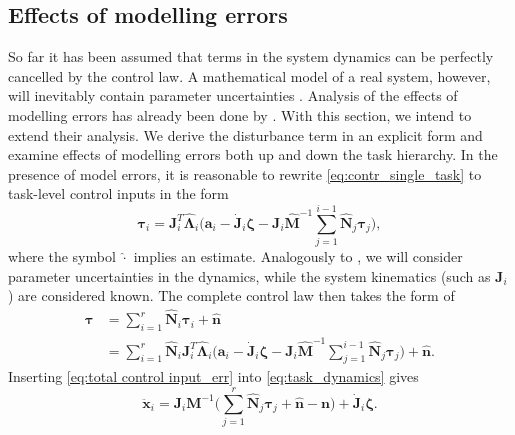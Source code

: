 \documentclass[../main.tex]{subfiles}
\begin{document}
\subsection{Effects of modelling errors}
\label{sec:model_err}
So far it has been assumed that terms in the system dynamics can be perfectly cancelled by the control law. A mathematical model of a real system, however, will inevitably contain parameter uncertainties \citep{Nakanishi2008}. Analysis of the effects of modelling errors has already been done by \cite{Antonelli2018a, Dilillo2021}. With this section, we intend to extend their analysis. We derive the disturbance term in an explicit form and examine effects of modelling errors both up and down the task hierarchy. In the presence of model errors, it is reasonable to rewrite \eqref{eq:contr_single_task} to task-level control inputs in the form
\begin{equation}
    \label{eq:control_model_err}
    \bm{\tau}_i =
        \bm{J}_i^T\hat{\bm{\Lambda}}_i\bigg(\bm{a}_i - \dot{\bm{J}}_i\bm{\zeta} - \bm{J}_i \hat{\bm{M}}^{-1}\sum_{j=1}^{i-1}\hat{\bm{N}}_j \bm{\tau}_j\bigg),
\end{equation}
where the symbol $\hat{\cdot}$ implies an estimate. Analogously to \cite{Dilillo2021}, we will consider parameter uncertainties in the dynamics, while the system kinematics (such as $\bm{J}_i$) are considered known. The complete control law then takes the form of
\begin{equation}
    \begin{aligned}
    \label{eq:total control input_err}
    \bm{\tau} &= \sum_{i=1}^r \hat{\bm{N}}_i\bm{\tau}_i + \hat{\bm{n}} \\&=
    \sum_{i=1}^r \hat{\bm{N}}_{i}\bm{J}_i^T\hat{\bm{\Lambda}}_i \bigg( \bm{a}_i - \dot{\bm{J}}_i\bm{\zeta} - \bm{J}_i \hat{\bm{M}}^{-1}\sum_{j=1}^{i-1}\hat{\bm{N}}_j \bm{\tau}_j\bigg) + \hat{\bm{n}}.
    \end{aligned}
\end{equation}
Inserting \eqref{eq:total control input_err} into \eqref{eq:task_dynamics} gives
\begin{equation}
    \ddot{\bm{x}}_i = \bm{J}_i \bm{M}^{-1} \bigg( \sum^{r}_{j=1} \hat{\bm{N}}_j \bm{\tau}_j + \hat{\bm{n}} - \bm{n} \bigg) + \dot{\bm{J}}_i \bm{\zeta}.
\end{equation}
\end{document}
